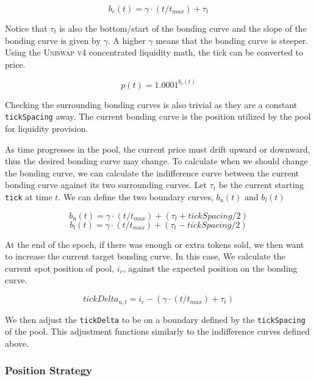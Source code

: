 \documentclass[sigconf,nonacm,prologue,table]{acmart}
\numberwithin{equation}{section}
\theoremstyle{definition}
\theoremstyle{remark}
\begin{document}
\begin{equation}
    b_c(t) = \gamma \cdot (t / t_{max}) + \tau_{t}
\end{equation}

Notice that $\tau_t$ is also the bottom/start of the bonding curve and the slope of the bonding curve is given by $\gamma$. A higher $\gamma$ means that the bonding curve is steeper. Using the \textsc{Uniswap v4} concentrated liquidity math, the tick can be converted to price.

\begin{equation}
    p(t) = 1.0001^{b_c(t)}
\end{equation}

Checking the surrounding bonding curves is also trivial as they are a constant \verb|tickSpacing| away. The current bonding curve is the position utilized by the pool for liquidity provision.

As time progresses in the pool, the current price must drift upward or downward, thus the desired bonding curve may change. To calculate when we should change the bonding curve, we can calculate the indifference curve between the current bonding curve against its two surrounding curves. Let $\tau_{t}$ be the current starting \verb|tick| at time $t$. We can define the two boundary curves, $b_u(t)$ and $b_l(t)$

\begin{equation} \label{eq:upperboundry}
    b_u(t) = \gamma \cdot (t / t_{max}) + (\tau_{t} + tickSpacing / 2)
\end{equation}
\begin{equation} \label{eq:lowerboundry}
    b_l(t) = \gamma \cdot (t / t_{max}) + (\tau_{t} - tickSpacing / 2)
\end{equation}

At the end of the epoch, if there was enough or extra tokens sold, we then want to increase the current target bonding curve. In this case, We calculate the current spot position of pool, $i_c$, against the expected position on the bonding curve.

\begin{equation} 
   tickDelta_{u,t} = i_c - (\gamma \cdot (t / t_{max}) + \tau_t)
\end{equation} 

We then adjust the \verb|tickDelta| to be on a boundary defined by the \verb|tickSpacing| of the pool. This adjustment functions similarly to the indifference curves defined above.

\subsubsection{Position Strategy}
\end{document}
